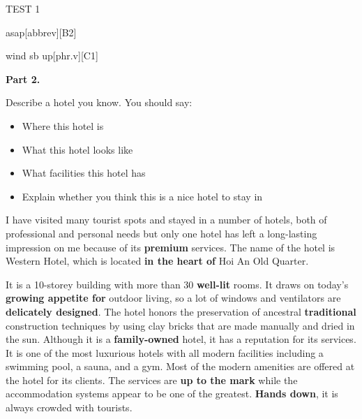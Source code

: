 \begin{glossarymc}[Cambridge 15]
\begin{test}{TEST 1}
\begin{VocabExplain}[Part 1]
            \begin{ExplainCard}{asap}[abbrev][B2]
            \end{ExplainCard}

            \begin{ExplainCard}{wind sb up}[phr.v][C1]
            \end{ExplainCard}
        \end{VocabExplain}

    \noindent
    \textbf{Part 2.}
    \begin{qa}{Describe a hotel you know. You should say:}
    \begin{itemize}
        \item Where this hotel is
        \item What this hotel looks like
        \item What facilities this hotel has
        \item Explain whether you think this is a nice hotel to stay in
    \end{itemize}

    I have visited many tourist spots and stayed in a number of hotels, both of professional and personal needs but only one hotel has left a long-lasting impression on me because of its \textbf{premium} services. The name of the hotel is Western Hotel, which is located \textbf{in the heart of} Hoi An Old Quarter.  

    It is a 10-storey building with more than 30 \textbf{well-lit} rooms. It draws on today’s \textbf{growing appetite for} outdoor living, so a lot of windows and ventilators are \textbf{delicately designed}. The hotel honors the preservation of ancestral \textbf{traditional} construction techniques by using clay bricks that are made manually and dried in the sun. Although it is a \textbf{family-owned} hotel, it has a reputation for its services. It is one of the most luxurious hotels with all modern facilities including a swimming pool, a sauna, and a gym. Most of the modern amenities are offered at the hotel for its clients. The services are \textbf{up to the mark} while the accommodation systems appear to be one of the greatest. \textbf{Hands down}, it is always crowded with tourists.  


\end{qa}
\end{test}
\end{glossarymc}
